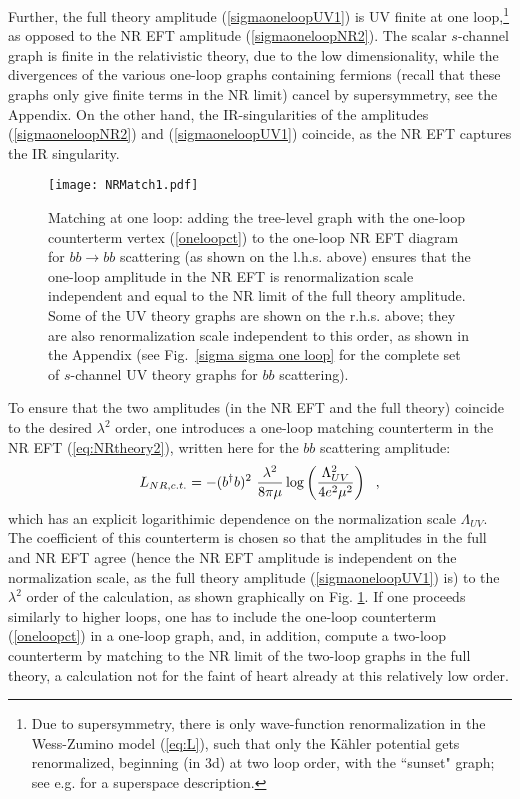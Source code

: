\documentclass[11pt]{article}
\begin{document}
Further, the full theory amplitude (\ref{sigmaoneloopUV1})  is UV finite at one loop,\footnote{Due to supersymmetry, there is only wave-function renormalization in the Wess-Zumino model (\ref{eq:L}), such that only the K\" ahler potential  gets renormalized, beginning (in 3d) at two loop order, with the ``sunset" graph; see e.g. \cite{Bagger:1995ay}  for a superspace description.} as opposed to the NR EFT amplitude (\ref{sigmaoneloopNR2}). The scalar $s$-channel graph is finite in the relativistic theory, due to the low dimensionality, while the divergences of the various one-loop graphs containing fermions (recall that these graphs only give finite terms in the NR limit) cancel by supersymmetry, see the Appendix. On the other hand, the IR-singularities of the amplitudes (\ref{sigmaoneloopNR2}) and (\ref{sigmaoneloopUV1}) coincide, as the NR EFT captures the IR singularity. 

\begin{figure}[t] %
   \centering
   \texttt{[image: NRMatch1.pdf]} 
   \caption{Matching at one loop: adding the tree-level graph with the one-loop counterterm vertex (\ref{oneloopct}) to the one-loop NR EFT diagram for $bb \rightarrow bb$ scattering (as shown on the l.h.s. above) ensures that the one-loop amplitude in the NR EFT is renormalization scale independent and equal to the NR limit of the full theory amplitude. Some of the UV theory graphs are shown on the r.h.s. above; they are also renormalization scale independent to this order, as shown in the Appendix (see Fig.~\ref{sigma sigma one loop} for the complete set of $s$-channel UV theory graphs for $bb$ scattering).}
	\label{oneloopmatch}
\end{figure}

To ensure that the two amplitudes (in the NR EFT and the full theory) coincide to the desired $\lambda^2$ order, one introduces a one-loop matching counterterm in the NR EFT (\ref{eq:NRtheory2}), written here for the $bb$ scattering amplitude:
\begin{equation}
\label{oneloopct}
L_{NR, c.t.} = - (b^\dagger b)^2 ~ {\lambda^2 \over 8 \pi \mu} \log\left( {\Lambda_{UV}^2 \over 4 e^2 \mu^2}\right)\;  ~,
\end{equation}
which has an explicit  logarithimic dependence on the normalization scale $\Lambda_{UV}$. The coefficient of this counterterm is chosen so that the amplitudes in the full and NR EFT agree (hence the NR EFT amplitude is independent on the normalization scale, as the full theory amplitude (\ref{sigmaoneloopUV1}) is) to the $\lambda^2$ order of the calculation, as shown graphically on Fig. \ref{oneloopmatch}. 
If one proceeds similarly to higher loops, one has to  include the one-loop counterterm (\ref{oneloopct}) in a one-loop graph, and,  in addition,  compute a two-loop counterterm by matching to the NR limit of the two-loop graphs in the full theory, a calculation not for the faint of heart already at this relatively low order.
\end{document}
